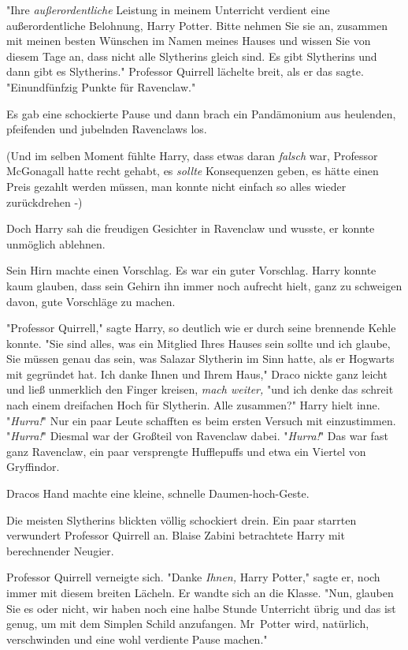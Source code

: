{"Ihre \emph{außerordentliche} Leistung in meinem Unterricht verdient eine außerordentliche Belohnung, Harry Potter. Bitte nehmen Sie sie an, zusammen mit meinen besten Wünschen im Namen meines Hauses und wissen Sie von diesem Tage an, dass nicht alle Slytherins gleich sind. Es gibt Slytherins und dann gibt es Slytherins." Professor Quirrell lächelte breit, als er das sagte. "Einundfünfzig Punkte für Ravenclaw."

Es gab eine schockierte Pause und dann brach ein Pandämonium aus heulenden, pfeifenden und jubelnden Ravenclaws los.

(Und im selben Moment fühlte Harry, dass etwas daran \emph{falsch} war, Professor McGonagall hatte recht gehabt, es \emph{sollte} Konsequenzen geben, es hätte einen Preis gezahlt werden müssen, man konnte nicht einfach so alles wieder zurückdrehen -)

Doch Harry sah die freudigen Gesichter in Ravenclaw und wusste, er konnte unmöglich ablehnen.

Sein Hirn machte einen Vorschlag. Es war ein guter Vorschlag. Harry konnte kaum glauben, dass sein Gehirn ihn immer noch aufrecht hielt, ganz zu schweigen davon, gute Vorschläge zu machen.

"Professor Quirrell," sagte Harry, so deutlich wie er durch seine brennende Kehle konnte. "Sie sind alles, was ein Mitglied Ihres Hauses sein sollte und ich glaube, Sie müssen genau das sein, was Salazar Slytherin im Sinn hatte, als er Hogwarts mit gegründet hat. Ich danke Ihnen und Ihrem Haus," Draco nickte ganz leicht und ließ unmerklich den Finger kreisen, \emph{mach weiter,} "und ich denke das schreit nach einem dreifachen Hoch für Slytherin. Alle zusammen?" Harry hielt inne. "\emph{Hurra!}" Nur ein paar Leute schafften es beim ersten Versuch mit einzustimmen. "\emph{Hurra!}" Diesmal war der Großteil von Ravenclaw dabei. "\emph{Hurra!}" Das war fast ganz Ravenclaw, ein paar versprengte Hufflepuffs und etwa ein Viertel von Gryffindor.

Dracos Hand machte eine kleine, schnelle Daumen-hoch-Geste.

Die meisten Slytherins blickten völlig schockiert drein. Ein paar starrten verwundert Professor Quirrell an. Blaise Zabini betrachtete Harry mit berechnender Neugier.

Professor Quirrell verneigte sich. "Danke \emph{Ihnen,} Harry Potter," sagte er, noch immer mit diesem breiten Lächeln. Er wandte sich an die Klasse. "Nun, glauben Sie es oder nicht, wir haben noch eine halbe Stunde Unterricht übrig und das ist genug, um mit dem Simplen Schild anzufangen. Mr~Potter wird, natürlich, verschwinden und eine wohl verdiente Pause machen."

}
